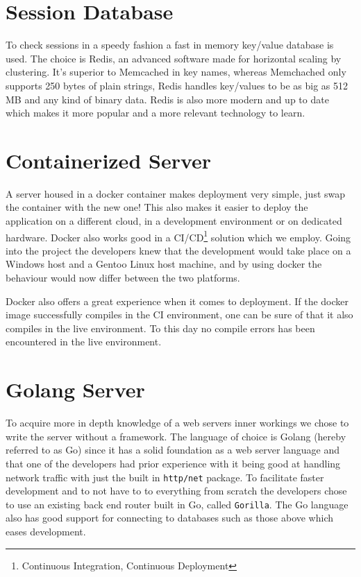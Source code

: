 \documentclass[12pt,a4paper]{report}
\begin{document}
\section{Session Database}
To check sessions in a speedy fashion a fast in memory key/value database is used. The choice is Redis, an advanced software made for horizontal scaling by clustering. It's superior to Memcached in key names, whereas Memchached only supports 250 bytes of plain strings\cite{memcache-key-size}, Redis handles key/values to be as big as 512 MB\cite{redis-key-size} and any kind of binary data. Redis is also more modern and up to date which makes it more popular and a more relevant technology to learn\cite{key-value-comparison}\cite{redis-vs-memcached}.

\section{Containerized Server}
A server housed in a docker container makes deployment very simple, just swap the container with the new one! This also makes it easier to deploy the application on a different cloud, in a development environment or on dedicated hardware. Docker also works good in a CI/CD\footnote{Continuous Integration, Continuous Deployment} solution which we employ\cite{why-docker}.
Going into the project the developers knew that the development would take place on a Windows host and a Gentoo Linux host machine, and by using docker the behaviour would now differ between the two platforms.

Docker also offers a great experience when it comes to deployment. If the docker image successfully compiles in the CI environment, one can be sure of that it also compiles in the live environment. To this day no compile errors has been encountered in the live environment.

\section{Golang Server}
To acquire more in depth knowledge of a web servers inner workings we chose to write the server without a framework. The language of choice is Golang (hereby referred to as Go) since it has a solid foundation as a web server language and that one of the developers had prior experience with it being good at handling network traffic with just the built in \texttt{http/net} package. To facilitate faster development and to not have to to everything from scratch the developers chose to use an existing back end router built in Go, called \texttt{Gorilla}.
The Go language also has good support for connecting to databases such as those above which eases development. 
\end{document}
